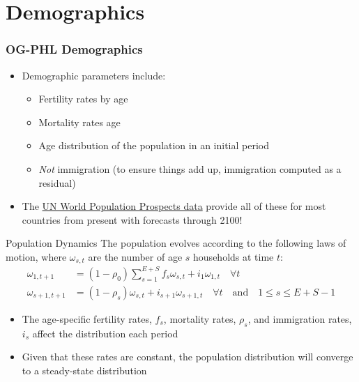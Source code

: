 \documentclass{beamer}
\begin{document}
\section{Demographics}
\begin{frame}
\frametitle{OG-PHL Demographics}
  \begin{itemize}
      \item Demographic parameters include:
          \begin{itemize}
              \item Fertility rates by age
              \item Mortality rates age
              \item Age distribution of the population in an initial period
              \item \emph{Not} immigration (to ensure things add up, immigration computed as a residual)
          \end{itemize}
      \item The \href{https://population.un.org/wpp/}{UN World Population Prospects data} provide all of these for most countries from present with forecasts through 2100!
  \end{itemize}
\end{frame}

\begin{frame}{Population Dynamics}
    The population evolves according to the following laws of motion, where $\omega_{s,t}$ are the number of age $s$ households at time $t$:
    \begin{equation*}
      \begin{split}
        \omega_{1,t+1} &= (1 - \rho_0)\sum_{s=1}^{E+S} f_s\omega_{s,t} + i_1\omega_{1,t}\quad\forall t \\
        \omega_{s+1,t+1} &= (1 - \rho_s)\omega_{s,t} + i_{s+1}\omega_{s+1,t}\quad\forall t\quad\text{and}\quad 1\leq s \leq E+S-1
      \end{split}
    \end{equation*}
    \begin{itemize}
        \item The age-specific fertility rates, $f_s$, mortality rates, $\rho_s$, and immigration rates, $i_s$ affect the distribution each period
        \item Given that these rates are constant, the population distribution will converge to a steady-state distribution
    \end{itemize}
\end{frame}
\end{document}
